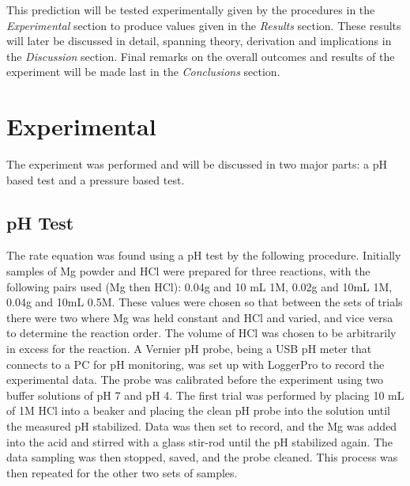 \documentclass[12pt, letterpaper]{article}
\begin{document}
This prediction will be tested experimentally given by the procedures in the \textit{Experimental} section to produce values given in the \textit{Results} section. These results will later be discussed in detail, spanning theory, derivation and implications in the \textit{Discussion } section. Final remarks on the overall outcomes and results of the experiment will be made last in the \textit{Conclusions} section.


\section{Experimental}
The experiment was performed and will be discussed in two major parts: a pH based test and a pressure based test.
\subsection{pH Test}
The rate equation was found using a pH test by the following procedure. Initially samples of Mg powder and HCl were prepared for three reactions, with the following pairs used (Mg then HCl): 0.04g and 10 mL 1M, 0.02g and 10mL 1M, 0.04g and 10mL 0.5M. These values were chosen so that between the sets of trials there were two where Mg was held constant and HCl and varied, and vice versa to determine the reaction order. The volume of HCl was chosen to be arbitrarily in excess for the reaction. A Vernier pH probe, being a USB pH meter that connects to a PC for pH monitoring, was set up with LoggerPro to record the experimental data. The probe was calibrated before the experiment using two buffer solutions of pH 7 and pH 4. The first trial was performed by placing 10 mL of 1M HCl into a beaker and placing the clean pH probe into the solution until the measured pH stabilized. Data was then set to record, and the Mg was added into the acid and stirred with a glass stir-rod until the pH stabilized again. The data sampling was then stopped, saved, and the probe cleaned. This process was then repeated for the other two sets of samples.
\end{document}
